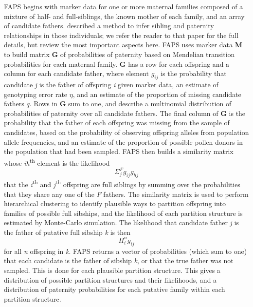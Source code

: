 \documentclass[10pt, a4paper, twocolumn]{article} %
\begin{document}
FAPS begins with marker data for one or more maternal families composed of a mixture of half- and full-siblings, the known mother of each family, and an array of candidate fathers.
\textcite{ellis2018efficient} described a method to infer sibling and paternity relationships in those individuals; we refer the reader to that paper for the full details, but review the most important aspects here.
FAPS uses marker data \textbf{M} to build matrix \textbf{G} of probabilities of paternity based on Mendelian transition probabilities for each maternal family. \textbf{G} has a row for each offspring and a column for each candidate father, where element $g_{ij}$ is the probability that candidate \textit{j} is the father of offspring \textit{i} given marker data, an estimate of genotyping error rate $\eta$, and an estimate of the proportion of missing candidate fathers $q$. Rows in \textbf{G} sum to one, and describe a multinomial distribution of probabilities of paternity over all candidate fathers. The final column of \textbf{G} is the probability that the father of each offspring was missing from the sample of candidates, based on the probability of observing offspring alleles from population allele frequencies, and an estimate of the proportion of possible pollen donors in the population that had been sampled. FAPS then builds a similarity matrix whose \textit{ih}\textsuperscript{th} element is the likelihood 
\begin{equation}\label{eqn:faps_similarity_matrix}
\Sigma_j^F g_{ij}g_{hj}
\end{equation}
that the \textit{i}\textsuperscript{th} and \textit{j}\textsuperscript{th} offspring are full siblings by summing over the probabilities that they share any one of the $F$ fathers. The similarity matrix is used to perform hierarchical clustering to identify plausible ways to partition offspring into families of possible full sibships, and the likelihood of each partition structure is estimated by Monte-Carlo simulation. The likelihood that candidate father \textit{j} is the father of putative full sibship \textit{k} is then
\begin{equation}\label{eqn:faps_lik_sibship}
\Pi_i^n g_{ij}
\end{equation}
for all \textit{n} offspring in \textit{k}. FAPS returns a vector of probabilities (which sum to one) that each candidate is the father of sibship \textit{k}, or that the true father was not sampled. This is done for each plausible partition structure. This gives a distribution of possible partition structures and their likelihoods, and a distribution of paternity probabilities for each putative family within each partition structure.
\end{document}
